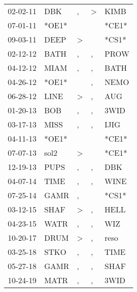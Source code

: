 \begin{supertabular}{lllll}
 02-02-11 &    DBK &                , &     \textgreater &   KIMB \\
 07-01-11 &  *OE1* &                  &                  &  *CE1* \\
 09-03-11 &   DEEP &     \textgreater &                  &  *CS1* \\
 02-12-12 &   BATH &                , &                , &   PROW \\
 04-12-12 &   MIAM &                , &                , &   BATH \\
 04-26-12 &  *OE1* &                  &                , &   NEMO \\
 06-28-12 &   LINE &     \textgreater &                , &    AUG \\
 01-20-13 &    BOB &                , &                , &   3WID \\
 03-17-13 &   MISS &                , &                , &   IJIG \\
 04-11-13 &  *OE1* &                  &                  &  *CE1* \\
 07-07-13 &   sol2 &     \textgreater &                  &  *CE1* \\
 12-19-13 &   PUPS &                , &                , &    DBK \\
 04-07-14 &   TIME &                , &                , &   WINE \\
 07-25-14 &   GAMR &                , &                  &  *CS1* \\
 03-12-15 &   SHAF &     \textgreater &                , &   HELL \\
 04-23-15 &   WATR &                , &                , &    WIZ \\
 10-20-17 &   DRUM &     \textgreater &                , &   reso \\
 03-25-18 &   STKO &                , &                , &   TIME \\
 05-27-18 &   GAMR &                , &                , &   SHAF \\
 10-24-19 &   MATR &                , &                , &   3WID \\
\end{supertabular}
